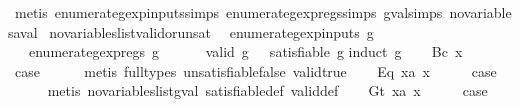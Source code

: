 \begin{isabellebody}
\ {\isacharparenleft}metis\ enumerate{\isacharunderscore}gexp{\isacharunderscore}inputs{\isachardot}simps{\isacharparenleft}{}{\isacharparenright}\ enumerate{\isacharunderscore}gexp{\isacharunderscore}regs{\isachardot}simps{\isacharparenleft}{}{\isacharparenright}\ gval{\isachardot}simps{\isacharparenleft}{}{\isacharparenright}\ no{\isacharunderscore}variables{\isacharunderscore}aval{\isacharparenright}\isanewline
{}\isamarkupfalse%
%
\endisatagproof
{\isafoldproof}%
%
\isadelimproof
\isanewline
%
\endisadelimproof
\isanewline
{}\isamarkupfalse%
\ no{\isacharunderscore}variables{\isacharunderscore}list{\isacharunderscore}valid{\isacharunderscore}or{\isacharunderscore}unsat{\isacharcolon}\isanewline
\ \ {\isachardoublequoteopen}enumerate{\isacharunderscore}gexp{\isacharunderscore}inputs\ g\ {\isacharequal}\ {\isacharbraceleft}{\isacharbraceright}\ {\isasymLongrightarrow}\isanewline
\ \ \ enumerate{\isacharunderscore}gexp{\isacharunderscore}regs\ g\ {\isacharequal}\ {\isacharbraceleft}{\isacharbraceright}\ {\isasymLongrightarrow}\isanewline
\ \ \ valid\ g\ {\isasymor}\ {\isasymnot}\ satisfiable\ g{\isachardoublequoteclose}\isanewline
%
\isadelimproof
%
\endisadelimproof
%
\isatagproof
{}\isamarkupfalse%
{\isacharparenleft}induct\ g{\isacharparenright}\isanewline
\ \ \isamarkupfalse%
\ {\isacharparenleft}Bc\ x{\isacharparenright}\isanewline
\ \ \isamarkupfalse%
\ \isamarkupfalse%
\ {\isacharquery}case\isanewline
\ \ \ \ \isamarkupfalse%
\ {\isacharparenleft}metis\ {\isacharparenleft}full{\isacharunderscore}types{\isacharparenright}\ unsatisfiable{\isacharunderscore}false\ valid{\isacharunderscore}true{\isacharparenright}\isanewline
{}\isamarkupfalse%
\isanewline
\ \ \isamarkupfalse%
\ {\isacharparenleft}Eq\ x{}a\ x{}{\isacharparenright}\isanewline
\ \ \isamarkupfalse%
\ \isamarkupfalse%
\ {\isacharquery}case\isanewline
\ \ \ \ \isamarkupfalse%
\ {\isacharparenleft}metis\ no{\isacharunderscore}variables{\isacharunderscore}list{\isacharunderscore}gval\ satisfiable{\isacharunderscore}def\ valid{\isacharunderscore}def{\isacharparenright}\isanewline
{}\isamarkupfalse%
\isanewline
\ \ \isamarkupfalse%
\ {\isacharparenleft}Gt\ x{}a\ x{}{\isacharparenright}\isanewline
\ \ \isamarkupfalse%
\ \isamarkupfalse%
\ {\isacharquery}case\isanewline

\end{isabellebody}
